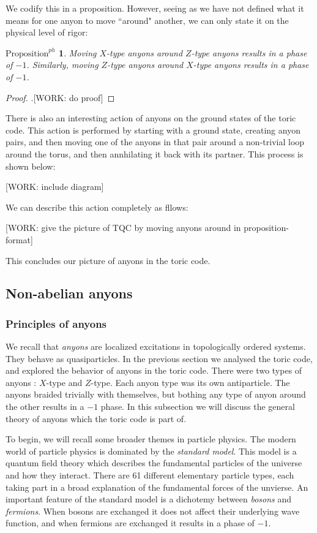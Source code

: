 \documentclass{article}
\newtheorem{propositionph}{$\text{Proposition}^{ph}$}[section]
\theoremstyle{definition}
\newcommand{\0}{\left|0\right>}
\newcommand{\1}{\left|1\right>}
\numberwithin{figure}{section}
\begin{document}
We codify this in a proposition. However, seeing as we have not defined what it means for one anyon to move ``around" another, we can only state it on the physical level of rigor:

\begin{propositionph} Moving $X$-type anyons around $Z$-type anyons results in a phase of $-1$. Similarly, moving $Z$-type anyons around $X$-type anyons results in a phase of $-1$.
\end{propositionph}
\begin{proof}.[WORK: do proof]
\end{proof}

There is also an interesting action of anyons on the ground states of the toric code. This action is performed by starting with a ground state, creating anyon pairs, and then moving one of the anyons in that pair around a non-trivial loop around the torus, and then annhilating it back with its partner. This process is shown below:

[WORK: include diagram]

We can describe this action completely as fllows:

[WORK: give the picture of TQC by moving anyons around in proposition-format]

This concludes our picture of anyons in the toric code.

\subsection{Non-abelian anyons}

\subsubsection{Principles of anyons}

We recall that \textit{anyons} are localized excitations in topologically ordered systems. They behave as quasiparticles. In the previous section we analysed the toric code, and explored the behavior of anyons in the toric code. There were two types of anyons : $X$-type and $Z$-type. Each anyon type was its own antiparticle. The anyons braided trivially with themselves, but bothing any type of anyon around the other results in a $-1$ phase. In this subsection we will discuss the general theory of anyons which the toric code is part of.

To begin, we will recall some broader themes in particle physics. The modern world of particle physics is dominated by the \textit{standard model}. This model is a quantum field theory which describes the fundamental particles of the universe and how they interact. There are 61 different elementary particle types, each taking part in a broad explanation of the fundamental forces of the unvierse. An important feature of the standard model is a dichotemy between \textit{bosons} and \textit{fermions}. When bosons are exchanged it does not affect their underlying wave function, and when fermions are exchanged it results in a phase of $-1$.
\end{document}
